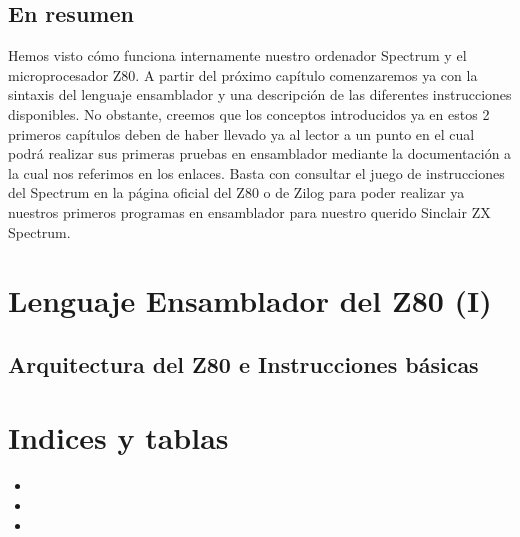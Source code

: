 \documentclass[letterpaper,10pt,spanish]{sphinxmanual}
\begin{document}
\section{En resumen}
\label{\detokenize{03_arquitectura/arquitectura:en-resumen}}
Hemos visto cómo funciona internamente nuestro ordenador Spectrum y el microprocesador Z80. A partir del próximo capítulo comenzaremos ya con la sintaxis del lenguaje ensamblador y una descripción de las diferentes instrucciones disponibles. No obstante, creemos que los conceptos introducidos ya en estos 2 primeros capítulos deben de haber llevado ya al lector a un punto en el cual podrá realizar sus primeras pruebas en ensamblador mediante la documentación a la cual nos referimos en los enlaces. Basta con consultar el juego de instrucciones del Spectrum en la página oficial del Z80 o de Zilog para poder realizar ya nuestros primeros programas en ensamblador para nuestro querido Sinclair ZX Spectrum.


\chapter{Lenguaje Ensamblador del Z80 (I)}
\label{\detokenize{04_lenguaje_ensamblador_01/lenguaje_ensamblador_01:lenguaje-ensamblador-del-z80-i}}\label{\detokenize{04_lenguaje_ensamblador_01/lenguaje_ensamblador_01::doc}}

\section{Arquitectura del Z80 e Instrucciones básicas}
\label{\detokenize{04_lenguaje_ensamblador_01/lenguaje_ensamblador_01:arquitectura-del-z80-e-instrucciones-basicas}}

\chapter{Indices y tablas}
\label{\detokenize{index:indices-y-tablas}}\begin{itemize}
\item {} 

\item {} 

\item {} 

\end{itemize}



\renewcommand{\indexname}{Índice}
\printindex
\end{document}

